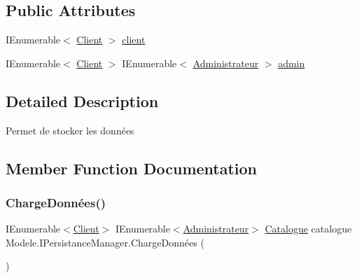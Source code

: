 \subsection*{Public Attributes}
\begin{DoxyCompactItemize}
\item 
I\+Enumerable$<$ \hyperlink{classModele_1_1Client}{Client} $>$ \hyperlink{interfaceModele_1_1IPersistanceManager_a0f7ffabee613173cb4de6362f9d946b0}{client}
\item 
I\+Enumerable$<$ \hyperlink{classModele_1_1Client}{Client} $>$ I\+Enumerable$<$ \hyperlink{classModele_1_1Administrateur}{Administrateur} $>$ \hyperlink{interfaceModele_1_1IPersistanceManager_a4613622305c67836114ec254f6a21337}{admin}
\end{DoxyCompactItemize}


\subsection{Detailed Description}
Permet de stocker les données 



\subsection{Member Function Documentation}
\mbox{\label{interfaceModele_1_1IPersistanceManager_af5ae97787e17b1c24fe878ed3d381873}} 
\subsubsection{\texorpdfstring{Charge\+Données()}{ChargeDonnées()}}
{\footnotesize\ttfamily I\+Enumerable$<$\hyperlink{classModele_1_1Client}{Client}$>$ I\+Enumerable$<$\hyperlink{classModele_1_1Administrateur}{Administrateur}$>$ \hyperlink{classModele_1_1Catalogue}{Catalogue} catalogue Modele.\+I\+Persistance\+Manager.\+Charge\+Données (\begin{DoxyParamCaption}{ }\end{DoxyParamCaption})}

\mbox{\label{interfaceModele_1_1IPersistanceManager_a1b1fcf75cf99ef247ad7f83b1e816ea4}} 
